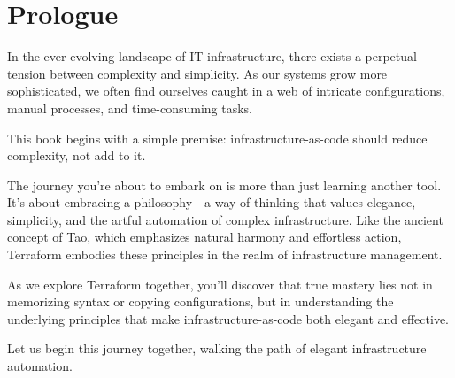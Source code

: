 \chapter*{Prologue}

In the ever-evolving landscape of IT infrastructure, there exists a perpetual tension between complexity and simplicity. As our systems grow more sophisticated, we often find ourselves caught in a web of intricate configurations, manual processes, and time-consuming tasks.

This book begins with a simple premise: infrastructure-as-code should reduce complexity, not add to it.

The journey you're about to embark on is more than just learning another tool. It's about embracing a philosophy—a way of thinking that values elegance, simplicity, and the artful automation of complex infrastructure. Like the ancient concept of Tao, which emphasizes natural harmony and effortless action, Terraform embodies these principles in the realm of infrastructure management.

As we explore Terraform together, you'll discover that true mastery lies not in memorizing syntax or copying configurations, but in understanding the underlying principles that make infrastructure-as-code both elegant and effective.

Let us begin this journey together, walking the path of elegant infrastructure automation.

\clearpage
